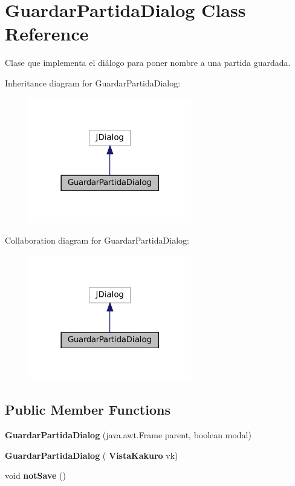 \section{Guardar\+Partida\+Dialog Class Reference}
\label{class_presentacion_1_1_guardar_partida_dialog}


Clase que implementa el diálogo para poner nombre a una partida guardada.  




Inheritance diagram for Guardar\+Partida\+Dialog\+:
\nopagebreak
\begin{figure}[H]
\begin{center}
\leavevmode
\includegraphics[width=201pt]{class_presentacion_1_1_guardar_partida_dialog__inherit__graph}
\end{center}
\end{figure}


Collaboration diagram for Guardar\+Partida\+Dialog\+:
\nopagebreak
\begin{figure}[H]
\begin{center}
\leavevmode
\includegraphics[width=201pt]{class_presentacion_1_1_guardar_partida_dialog__coll__graph}
\end{center}
\end{figure}
\subsection*{Public Member Functions}
\begin{DoxyCompactItemize}
\item 
\mbox{\label{class_presentacion_1_1_guardar_partida_dialog_af2a175ac9dd7d282e20d3390492e0f7d}} 
{\bfseries Guardar\+Partida\+Dialog} (java.\+awt.\+Frame parent, boolean modal)
\item 
\mbox{\label{class_presentacion_1_1_guardar_partida_dialog_a00665a0e7ffb74a58a1beca66d87d8ed}} 
{\bfseries Guardar\+Partida\+Dialog} (\textbf{ Vista\+Kakuro} vk)
\item 
\mbox{\label{class_presentacion_1_1_guardar_partida_dialog_a58b6a37bf49b31de62d02749a9a37d87}} 
void {\bfseries not\+Save} ()
\end{DoxyCompactItemize}
